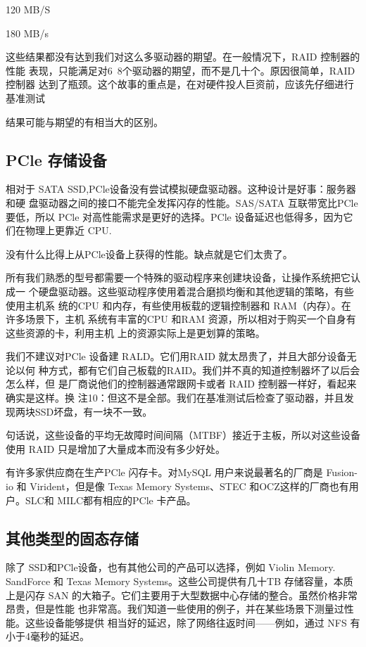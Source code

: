 120 MB/S

180 MB/s

这些结果都没有达到我们对这么多驱动器的期望。在一般情况下，RAID 控制器的性能
表现，只能满足对6~8个驱动器的期望，而不是几十个。原因很简单，RAID 控制器
达到了瓶颈。这个故事的重点是，在对硬件投人巨资前，应该先仔细进行基准测试

结果可能与期望的有相当大的区别。

\subsection{PCle 存储设备}
相对于 SATA SSD,PCle设备没有尝试模拟硬盘驱动器。这种设计是好事：服务器和硬
盘驱动器之间的接口不能完全发挥闪存的性能。SAS/SATA 互联带宽比PCle 要低，所以
PCle 对高性能需求是更好的选择。PCle 设备延迟也低得多，因为它们在物理上更靠近
CPU.

没有什么比得上从PCle设备上获得的性能。缺点就是它们太贵了。

所有我们熟悉的型号都需要一个特殊的驱动程序来创建块设备，让操作系统把它认成一
个硬盘驱动器。这些驱动程序使用着混合磨损均衡和其他逻辑的策略，有些使用主机系
统的CPU 和内存，有些使用板载的逻辑控制器和 RAM（内存）。在许多场景下，主机
系统有丰富的CPU 和RAM 资源，所以相对于购买一个自身有这些资源的卡，利用主机
上的资源实际上是更划算的策略。

我们不建议对PCle 设备建 RALD。它们用RAID 就太昂贵了，并且大部分设备无论以何
种方式，都有它们自己板载的RAID。我们并不真的知道控制器坏了以后会怎么样，但
是厂商说他们的控制器通常跟网卡或者 RAID 控制器一样好，看起来确实是这样。换
注10：但这不是全部。我们在基准测试后检查了驱动器，并且发现两块SSD坏盘，有一块不一致。

句话说，这些设备的平均无故障时间间隔（MTBF）接近于主板，所以对这些设备使用
RAID 只是增加了大量成本而没有多少好处。

有许多家供应商在生产PCle 闪存卡。对MySQL 用户来说最著名的厂商是 Fusion-io 和
Virident，但是像 Texas Memory Systems、STEC 和OCZ这样的厂商也有用户。SLC和
MILC都有相应的PCle 卡产品。

\subsection{其他类型的固态存储}
除了 SSD和PCle设备，也有其他公司的产品可以选择，例如 Violin Memory.
SandForce 和 Texas Memory Systems。这些公司提供有几十TB 存储容量，本质上是闪存
SAN 的大箱子。它们主要用于大型数据中心存储的整合。虽然价格非常昂贵，但是性能
也非常高。我们知道一些使用的例子，并在某些场景下测量过性能。这些设备能够提供
相当好的延迟，除了网络往返时间——例如，通过 NFS 有小于4毫秒的延迟。

